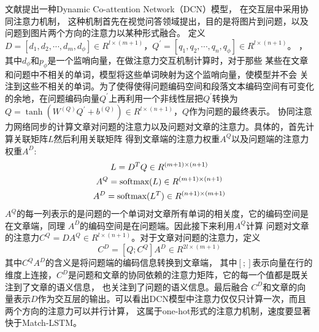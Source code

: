 文献\cite{Dynamic coattention networks for question answering}提出一种Dynamic Co-attention Network（DCN）模型，
在交互层中采用协同注意力\cite{VQACo}机制，
这种机制首先在视觉问答领域提出，目的是将图片到问题，以及问题到图片两个方向的注意力以某种形式融合。
定义$D=[d_1,d_2,\cdots,d_m,d_{\phi}] \in R^{l\times(m+1)}$，$Q^{'}=[q_1,q_2,\cdots,
q_n,q_{\phi}] \in R^{l\times(n+1)}$。
，其中$d_{\phi}$和$p_{\phi}$是一个监哨向量，在做注意力交互机制计算时，对于那些
某些在文章和问题中不相关的单词，模型将这些单词映射为这个监哨向量，使模型并不会
关注到这些不相关的单词。为了使得使得问题编码空间和段落文本编码空间有可变化的余地，在问题编码向量$Q^{'}$上再利用一个非线性层把$Q^{'}$转换为
$Q=\tanh(W^{(Q)}Q^{'}+b^{(Q)})\in R^{l\times(n+1)}$，$Q$作为问题的最终表示。
协同注意力网络同步的计算文章对问题的注意力以及问题对文章的注意力。具体的，首先计算关联矩阵$L$然后利用关联矩阵
得到文章端的注意力权重$A^Q$以及问题端的注意力权重$A^D$:
\begin{gather}
    L=D^{T}Q\in R^{(m+1)\times(n+1)} \notag \\
    A^Q=\text{softmax}(L)\in R^{(m+1)\times(n+1)} \notag \\
    A^D=\text{softmax}(L^T)\in R^{(n+1)\times(m+1)} \notag 
\end{gather}
$A^Q$的每一列表示的是问题的一个单词对文章所有单词的相关度，它的编码空间是在文章端，同理
$A^D$的编码空间是在问题端。因此接下来利用$A^Q$计算
问题对文章的注意力$C^Q=DA^Q\in R^{l\times(n+1)}$。对于文章对问题的注意力，定义
$$
C^D=[Q;C^Q]A^D\in R^{2l\times(m+1)}
$$
其中$C^QA^D$的含义是将问题端的编码信息转换到文章端，
其中$[;]$表示向量在行的维度上连接，$C^D$是问题和文章的协同依赖的注意力矩阵，它的每一个值都是既关注到了文章的语义信息，
也关注到了问题的语义信息。最后融合
$C^D$和文章的向量表示$D$作为交互层的输出。可以看出DCN模型中注意力仅仅只计算一次，而且两个方向的注意力可以并行计算，
这属于one-hot形式的注意力机制，速度要显著快于Match-LSTM。

